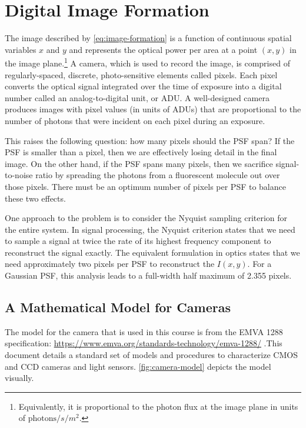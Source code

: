 \documentclass[10pt,a4paper,oneside]{book}
\begin{document}
\section{Digital Image Formation}

The image described by \autoref{eq:image-formation} is a function of continuous spatial variables $x$ and $y$ and represents the optical power per area at a point $\left(x, y\right)$ in the image plane.\footnote{Equivalently, it is proportional to the photon flux at the image plane in units of $\text{photons} / s / m^2$.} A camera, which is used to record the image, is comprised of regularly-spaced, discrete, photo-sensitive elements called pixels. Each pixel converts the optical signal integrated over the time of exposure into a digital number called an analog-to-digital unit, or ADU. A well-designed camera produces images with pixel values (in units of ADUs) that are proportional to the number of photons that were incident on each pixel during an exposure.

This raises the following question: how many pixels should the PSF span? If the PSF is smaller than a pixel, then we are effectively losing detail in the final image. On the other hand, if the PSF spans many pixels, then we sacrifice signal-to-noise ratio by spreading the photons from a fluorescent molecule out over those pixels. There must be an optimum number of pixels per PSF to balance these two effects.

One approach to the problem is to consider the Nyquist sampling criterion for the entire system. In signal processing, the Nyquist criterion states that we need to sample a signal at twice the rate of its highest frequency component to reconstruct the signal exactly. The equivalent formulation in optics states that we need approximately two pixels per PSF to reconstruct the $I \left(x, y\right)$. For a Gaussian PSF, this analysis leads to a full-width half maximum of 2.355 pixels.

\subsection{A Mathematical Model for Cameras}

The model for the camera that is used in this course is from the EMVA 1288 specification: \url{https://www.emva.org/standards-technology/emva-1288/} .This document details a standard set of models and procedures to characterize CMOS and CCD cameras and light sensors. \autoref{fig:camera-model} depicts the model visually.
\end{document}

